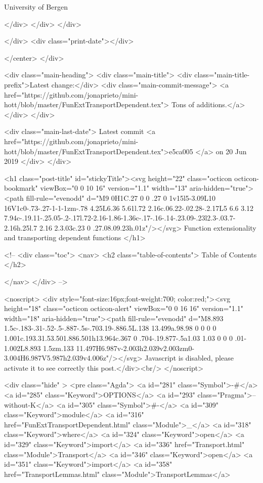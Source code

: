                   University of Bergen
                
                </div>
            </div>
          </div>
          
          
        </div>
        <div class="print-date"></div>
        
        
    </center>
  </div>

  
  <div class="main-heading">
    <div class="main-title">
      <div class="main-title-prefix">Latest change:</div>
      <div class="main-commit-message">
            <a href="https://github.com/jonaprieto/mini-hott/blob/master/FunExtTransportDependent.tex">
              Tons of additions.</a>
      </div>
    </div>

    <div class="main-last-date">
      Latest commit <a href="https://github.com/jonaprieto/mini-hott/blob/master/FunExtTransportDependent.tex">e5ca005 </a> on  20 Jun 2019
    </div>
  </div>
  
  <h1 class="post-title" id="stickyTitle"><svg height="22" class="octicon octicon-bookmark" viewBox="0 0 10 16" version="1.1" width="13" aria-hidden="true"><path fill-rule="evenodd" d="M9 0H1C.27 0 0 .27 0 1v15l5-3.09L10 16V1c0-.73-.27-1-1-1zm-.78 4.25L6.36 5.61l.72 2.16c.06.22-.02.28-.2.17L5 6.6 3.12 7.94c-.19.11-.25.05-.2-.17l.72-2.16-1.86-1.36c-.17-.16-.14-.23.09-.23l2.3-.03.7-2.16h.25l.7 2.16 2.3.03c.23 0 .27.08.09.23h.01z"/></svg> Function extensionality and transporting dependent functions 
  </h1>

  <!-- 
  <div class="toc">
    <nav>
    <h2 class="table-of-contents"> Table of Contents </h2>
      

    </nav>
  </div>
   -->

  <noscript>
  <div style="font-size:16px;font-weight:700; color:red;"><svg height="18" class="octicon octicon-alert" viewBox="0 0 16 16" version="1.1" width="18" aria-hidden="true"><path fill-rule="evenodd" d="M8.893 1.5c-.183-.31-.52-.5-.887-.5s-.703.19-.886.5L.138 13.499a.98.98 0 0 0 0 1.001c.193.31.53.501.886.501h13.964c.367 0 .704-.19.877-.5a1.03 1.03 0 0 0 .01-1.002L8.893 1.5zm.133 11.497H6.987v-2.003h2.039v2.003zm0-3.004H6.987V5.987h2.039v4.006z"/></svg> Javascript is disabled, please activate it to see correctly this post.</div><br/>
  </noscript>

  <div class="hide" >
<pre class="Agda">
<a id="281" class="Symbol">{-#</a> <a id="285" class="Keyword">OPTIONS</a> <a id="293" class="Pragma">--without-K</a> <a id="305" class="Symbol">#-}</a>
<a id="309" class="Keyword">module</a> <a id="316" href="FunExtTransportDependent.html" class="Module">_</a> <a id="318" class="Keyword">where</a>
<a id="324" class="Keyword">open</a> <a id="329" class="Keyword">import</a> <a id="336" href="Transport.html" class="Module">Transport</a>
<a id="346" class="Keyword">open</a> <a id="351" class="Keyword">import</a> <a id="358" href="TransportLemmas.html" class="Module">TransportLemmas</a>

